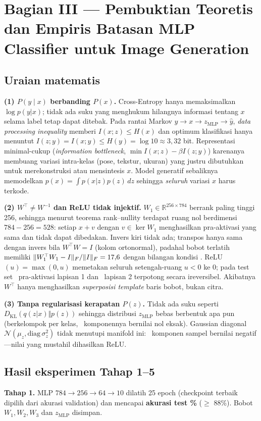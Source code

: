 \section{Bagian III --- Pembuktian Teoretis dan Empiris Batasan MLP Classifier untuk Image Generation}

\subsection{Uraian matematis}
\textbf{(1) $P(y\mid x)$ berbanding $P(x)$.} Cross-Entropy hanya memaksimalkan $\log p(y|x)$; tidak ada suku yang
menghukum hilangnya informasi tentang $x$ selama label tetap dapat ditebak. Pada rantai Markov
$y\to x\to z_{\text{MLP}}\to\hat{y}$, \emph{data processing inequality} memberi $I(x;z)\le H(x)$ dan
optimum klasifikasi hanya menuntut $I(z;y)=I(x;y)\le H(y)=\log 10\approx 3{,}32$ bit. Representasi minimal-cukup
(\emph{information bottleneck}, $\min I(x;z)-\beta I(z;y)$) karenanya membuang variasi intra-kelas (pose, tekstur, ukuran)
yang justru dibutuhkan untuk merekonstruksi atau mensintesis $x$. Model generatif sebaliknya memodelkan
$p(x)=\int p(x|z)p(z)\,dz$ sehingga \emph{seluruh} variasi $x$ harus terkode.

\textbf{(2) $W^{\top}\neq W^{-1}$ dan ReLU tidak injektif.} $W_1\in\mathbb{R}^{256\times784}$ berrank paling tinggi 256, sehingga
menurut teorema rank--nullity terdapat ruang nol berdimensi $784-256=528$: setiap $x+v$ dengan $v\in\ker W_1$
menghasilkan pra-aktivasi yang sama dan tidak dapat dibedakan. Invers kiri tidak ada; transpos hanya sama dengan invers
bila $W^{\top}W=I$ (kolom ortonormal), padahal bobot terlatih memiliki
$\lVert W_1^{\top}W_1-I\rVert_F/\lVert I\rVert_F=17{,}6$ dengan bilangan kondisi \WoneCond. ReLU$(u)=\max(0,u)$ memetakan seluruh
setengah-ruang $u<0$ ke 0; pada test set \ReluOne\ pra-aktivasi lapisan 1 dan \ReluTwo\ lapisan 2 terpotong secara ireversibel.
Akibatnya $W^{\top}$ hanya menghasilkan \emph{superposisi template} baris bobot, bukan citra.

\textbf{(3) Tanpa regularisasi kerapatan $P(z)$.} Tidak ada suku seperti $D_{\text{KL}}(q(z|x)\Vert p(z))$ sehingga
distribusi $z_{\text{MLP}}$ bebas berbentuk apa pun (berkelompok per kelas, \ZeroFrac\ komponennya bernilai nol eksak).
Gaussian diagonal $\mathcal{N}(\mu_z,\mathrm{diag}\,\sigma_z^2)$ tidak menutupi manifold ini: \NegFrac\ komponen sampel
bernilai negatif---nilai yang mustahil dihasilkan ReLU.

\subsection{Hasil eksperimen Tahap 1--5}
\textbf{Tahap 1.} MLP $784\!\to\!256\!\to\!64\!\to\!10$ dilatih 25 epoch (checkpoint terbaik dipilih dari akurasi
validation) dan mencapai \textbf{akurasi test \MLPacc\%} ($\ge$ 88\%). Bobot $W_1,W_2,W_3$ dan $z_{\text{MLP}}$ disimpan.

